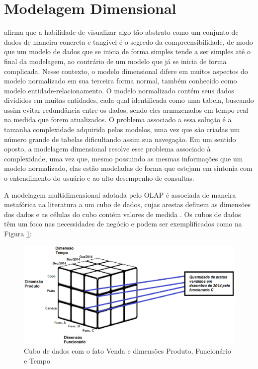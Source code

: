 \section{Modelagem Dimensional}

 afirma que a habilidade de visualizar algo tão abstrato como um conjunto de dados  de maneira concreta e tangível é o segredo da compreensibilidade, de modo que um modelo de dados que se inicia de forma simples tende a ser simples até o final da modelagem, ao contrário de um modelo que já se inicia de forma complicada. Nesse contexto, o modelo dimensional difere em muitos aspectos do modelo normalizado em sua terceira forma normal, também conhecido como modelo entidade-relacionamento. O modelo normalizado contém seus dados divididos em muitas entidades, cada qual identificada como uma tabela, buscando assim evitar redundância entre os dados, sendo eles armazenados em tempo real na medida que forem atualizados. O problema associado a essa solução é a tamanha complexidade adquirida pelos modelos, uma vez que são criadas um número grande de tabelas dificultando assim sua navegação. Em um sentido oposto, a modelagem dimensional resolve esse problema associado à complexidade, uma vez que, mesmo possuindo as mesmas informações que um modelo normalizado, elas estão modeladas de forma que estejam em sintonia com o entendimento do usuário e ao alto desempenho de consultas. 

 
A modelagem multidimensional adotada pelo OLAP é associada de maneira metafórica na literatura a um cubo de dados, cujas arestas definem as dimensões dos dados e as células do cubo contém valores de medida \cite{Kimball2002}. Os cubos de dados têm um foco nas necessidades de negócio e podem ser exemplificados como na Figura \ref{fig:cubo}:

\begin{figure}[h!]
\centering
\includegraphics[keepaspectratio=false,scale=0.60]{figuras/figuras_matheus/cubo.eps}
\caption{Cubo de dados com o fato Venda e dimensões Produto, Funcionário e Tempo}
\label{fig:cubo}
\end{figure}
\FloatBarrier

